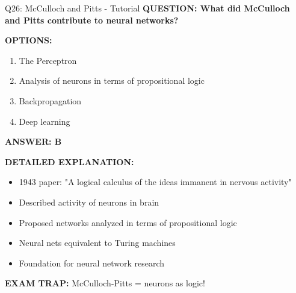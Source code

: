 \documentclass[8pt]{beamer}
\begin{document}
	\begin{frame}{Q26: McCulloch and Pitts - Tutorial}
		\fontsize{6.5}{7.5}\selectfont
		\textbf{QUESTION: What did McCulloch and Pitts contribute to neural networks?}
		
		\vspace{0.1cm}
		\textbf{OPTIONS:}
		\begin{enumerate}
			\item The Perceptron
			\item Analysis of neurons in terms of propositional logic
			\item Backpropagation
			\item Deep learning
		\end{enumerate}
		
		\vspace{0.1cm}
		\textcolor{myblue}{\textbf{ANSWER: B}}
		
		\vspace{0.1cm}
		\textbf{DETAILED EXPLANATION:}
		\begin{itemize}
			\item 1943 paper: "A logical calculus of the ideas immanent in nervous activity"
			\item Described activity of neurons in brain
			\item Proposed networks analyzed in terms of propositional logic
			\item Neural nets equivalent to Turing machines
			\item Foundation for neural network research
		\end{itemize}
		
		\vspace{0.1cm}
		\textcolor{myred}{\textbf{EXAM TRAP:}} McCulloch-Pitts = \textcolor{myblue}{neurons as logic}!
	\end{frame}
	
\end{document}
